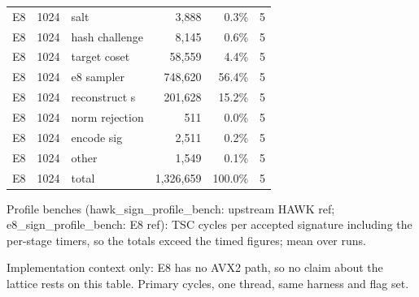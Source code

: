 \begin{table}[t]
{\begin{tabular}{lrlrrr}
E8 & 1024 & salt & 3{,}888 & 0.3\% & 5 \\
E8 & 1024 & hash challenge & 8{,}145 & 0.6\% & 5 \\
E8 & 1024 & target coset & 58{,}559 & 4.4\% & 5 \\
E8 & 1024 & e8 sampler & 748{,}620 & 56.4\% & 5 \\
E8 & 1024 & reconstruct s & 201{,}628 & 15.2\% & 5 \\
E8 & 1024 & norm rejection & 511 & 0.0\% & 5 \\
E8 & 1024 & encode sig & 2{,}511 & 0.2\% & 5 \\
E8 & 1024 & other & 1{,}549 & 0.1\% & 5 \\
E8 & 1024 & total & 1{,}326{,}659 & 100.0\% & 5 \\
\bottomrule
\end{tabular}}
\par\smallskip\parbox{\linewidth}{\scriptsize Profile benches (hawk\_sign\_profile\_bench: upstream HAWK ref; e8\_sign\_profile\_bench: E8 ref): TSC cycles per accepted signature including the per-stage timers, so the totals exceed the timed figures; mean over runs.}
\end{table}

\begin{table}[t]
\centering\footnotesize
\caption{Context: HAWK AVX2 (upstream Optimized\_Implementation; not a fair pair) (flags O2, run set headline)}
\label{tab:cmp7-o2}
\par\smallskip\parbox{\linewidth}{\scriptsize Implementation context only: E8 has no AVX2 path, so no claim about the lattice rests on this table. Primary cycles, one thread, same harness and flag set.}
\end{table}

